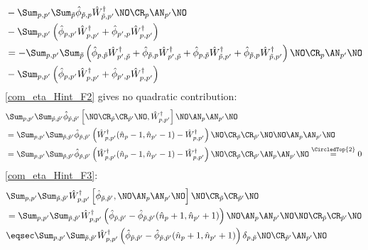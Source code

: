 \begin{appendix}
\begin{itemize}
\begin{align}
&-\Sum_{p, p^\prime}\Sum_{\tilde p} \hat\phi_{\tilde p,p}\hat W_{\tilde p,p^\prime}^\dagger\NO\CR_{p}\AN_{p^\prime}\NO \nonumber\\
&-\Sum_{p, p^\prime}\left( \hat\phi_{ p, p^\prime}\hat W_{p,p^\prime}^\dagger+ \hat\phi_{p^\prime,p}\hat W_{p,p^\prime}^\dagger\right)\nonumber\\
&=-\Sum_{p, p^\prime}\Sum_{\tilde p} \left(\hat\phi_{p,\tilde p}\hat W_{p^\prime,\tilde p}^\dagger+\hat\phi_{\tilde p,p}\hat W_{p^\prime,\tilde p}^\dagger+\hat\phi_{p,\tilde p}\hat W_{\tilde p,p^\prime}^\dagger  + \hat\phi_{\tilde p,p}\hat W_{\tilde p,p^\prime}^\dagger\right)\NO\CR_{p}\AN_{p^\prime}\NO \\
&-\Sum_{p, p^\prime}\left( \hat\phi_{ p, p^\prime}\hat W_{p,p^\prime}^\dagger+ \hat\phi_{p^\prime,p}\hat W_{p,p^\prime}^\dagger\right)\nonumber
\end{align}
\ref{com_eta_Hint_F2} gives no quadratic contribution:
\begin{align}
&\Sum_{p, p^\prime}\Sum_{\tilde p,\tilde p^\prime}\hat\phi_{\tilde p,\tilde p^\prime} \left[\NO\CR_{\tilde p}\CR_{\tilde p^\prime}\NO,\hat W_{p,p^\prime}^\dagger\right]\NO\AN_p\AN_{p^\prime}\NO\nonumber\\
&=\Sum_{p, p^\prime}\Sum_{\tilde p,\tilde p^\prime}\hat\phi_{\tilde p,\tilde p^\prime} \left(\hat W_{p,p^\prime}^\dagger(\hat n_p-1,\hat n_{p^\prime}-1)-\hat W_{p,p^\prime}^\dagger\right)\NO\CR_{\tilde p}\CR_{\tilde p^\prime}\NO\NO\AN_p\AN_{p^\prime}\NO\nonumber\\
&=\Sum_{p, p^\prime}\Sum_{\tilde p,\tilde p^\prime}\hat\phi_{\tilde p,\tilde p^\prime} \left(\hat W_{p,p^\prime}^\dagger(\hat n_p-1,\hat n_{p^\prime}-1)-\hat W_{p,p^\prime}^\dagger\right)\NO\CR_{\tilde p}\CR_{\tilde p^\prime}\AN_p\AN_{p^\prime}\NO\overset{\CircledTop{2}}=0
\end{align}
\ref{com_eta_Hint_F3}:
\begin{align}
&\Sum_{p, p^\prime}\Sum_{\tilde p,\tilde p^\prime}\hat W_{p,p^\prime}^\dagger \left[\hat\phi_{\tilde p,\tilde p^\prime},\NO\AN_p\AN_{p^\prime}\NO\right]\NO\CR_{\tilde p}\CR_{\tilde p^\prime}\NO\nonumber\\
&=\Sum_{p, p^\prime}\Sum_{\tilde p,\tilde p^\prime}\hat W_{p,p^\prime}^\dagger \left(\hat\phi_{\tilde p,\tilde p^\prime}-\hat\phi_{\tilde p,\tilde p^\prime}(\hat n_p+1,\hat n_{p^\prime}+1)\right)\NO\AN_p\AN_{p^\prime}\NO\NO\CR_{\tilde p}\CR_{\tilde p^\prime}\NO\\
&\eqsec \Sum_{p, p^\prime}\Sum_{\tilde p,\tilde p^\prime}\hat W_{p,p^\prime}^\dagger \left(\hat\phi_{\tilde p,\tilde p^\prime}-\hat\phi_{\tilde p,\tilde p^\prime}(\hat n_p+1,\hat n_{p^\prime}+1)\right)\delta_{p,\tilde p}\NO\CR_{\tilde p^\prime}\AN_{p^\prime}\NO \\

\end{align}
\end{itemize}
\end{appendix}
